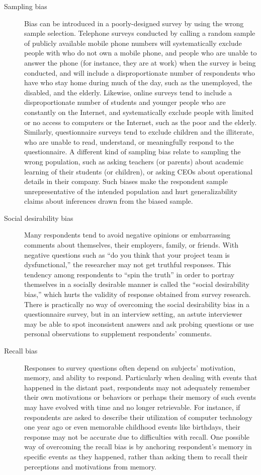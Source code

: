 \begin{description}
\item[Sampling bias] Bias can be introduced in a poorly-designed survey by using the wrong sample selection. Telephone surveys conducted by calling a random sample of publicly available mobile phone numbers will systematically exclude people with who do not own a mobile phone, and people who are unable to answer the phone (for instance, they are at work) when the survey is being conducted, and will include a disproportionate number of respondents who have who stay home during much of the day, such as the unemployed, the disabled, and the elderly. Likewise, online surveys tend to include a disproportionate number of students and younger people who are constantly on the Internet, and systematically exclude people with limited or no access to computers or the Internet, such as the poor and the elderly. Similarly, questionnaire surveys tend to exclude children and the illiterate, who are unable to read, understand, or meaningfully respond to the questionnaire. A different kind of sampling bias relate to sampling the wrong population, such as asking teachers (or parents) about academic learning of their students (or children), or asking CEOs about operational details in their company. Such biases make the respondent sample unrepresentative of the intended population and hurt generalizability claims about inferences drawn from the biased sample.

\item[Social desirability bias] Many respondents tend to avoid negative opinions or embarrassing comments about themselves, their employers, family, or friends. With negative questions such as ``do you think that your project team is dysfunctional,'' the researcher may not get truthful responses. This tendency among respondents to ``spin the truth'' in order to portray themselves in a socially desirable manner is called the ``social desirability bias,'' which hurts the validity of response obtained from survey research. There is practically no way of overcoming the social desirability bias in a questionnaire survey, but in an interview setting, an astute interviewer may be able to spot inconsistent answers and ask probing questions or use personal observations to supplement respondents' comments.

\item[Recall bias] Responses to survey questions often depend on subjects' motivation, memory, and ability to respond. Particularly when dealing with events that happened in the distant past, respondents may not adequately remember their own motivations or behaviors or perhaps their memory of such events may have evolved with time and no longer retrievable. For instance, if respondents are asked to describe their utilization of computer technology one year ago or even memorable childhood events like birthdays, their response may not be accurate due to difficulties with recall. One possible way of overcoming the recall bias is by anchoring respondent's memory in specific events as they happened, rather than asking them to recall their perceptions and motivations from memory.


\end{description}
